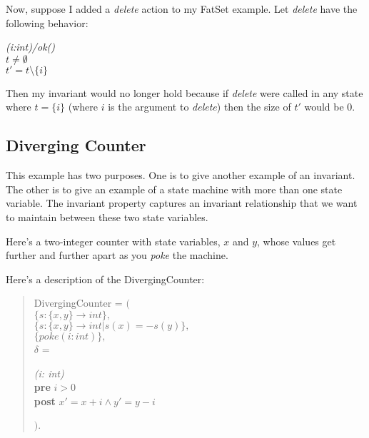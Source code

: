 Now, suppose I added a {\em delete} action to my FatSet example.
Let {\em delete} have the following behavior:

\begin{spec}
\begin{tabbing}
\={\em (i:int)/ok()}\\
             $t \neq \emptyset$\\
             $t' = t\setminus\{i\}$
\end{tabbing}
\end{spec}

\noindent Then my invariant would no longer hold because
if {\em delete} were called in any state where $t = \{i\}$
(where $i$ is the argument to {\em delete})
then the size of $t'$ would be 0.

\subsection{Diverging Counter}
This example has two purposes.
One is
to give another example of an
invariant.  The other is
to give an example of a state machine with more
than one state variable.  The invariant property captures an invariant
relationship that we want to maintain between these two state variables.

Here's a two-integer counter with state variables, $x$ and $y$, whose
values get further and further apart as you {\em poke} the machine.

\centerline{}


Here's a description of the DivergingCounter:

\begin{verse}
DivergingCounter = $($ \\
$\{ s: \{x, y\} \rightarrow int \},$ \\
$\{ s: \{x, y\} \rightarrow int | s(x) = -s(y) \},$ \\
$\{poke(i: int)\},$ \\
$\delta$ = \\

\begin{spec}
\begin{tabbing}
\={\em (i: int)}\\
           \> {\bf pre} $i > 0$\\
           \> {\bf post} $x' = x + i \wedge y' = y - i$
\end{tabbing}
\end{spec}

$)$.
\end{verse}

